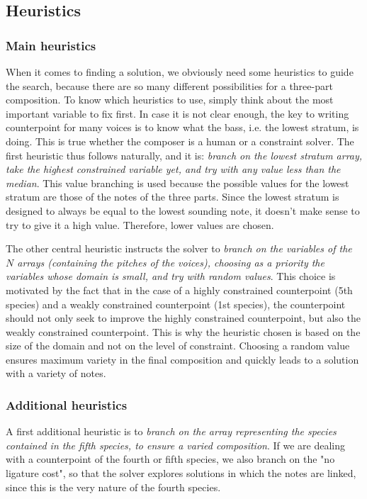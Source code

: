 \subsection{Heuristics} \label{heuristics}
\subsubsection{Main heuristics}
When it comes to finding a solution, we obviously need some heuristics to guide the search, because there are so many different possibilities for a three-part composition. 
To know which heuristics to use, simply think about the most important variable to fix first. In case it is not clear enough, the key to writing counterpoint for many voices is to know what the bass, i.e. the lowest stratum, is doing. This is true whether the composer is a human or a constraint solver. The first heuristic thus follows naturally, and it is: \textit{branch on the lowest stratum array, take the highest constrained variable yet, and try with any value less than the median}. This value branching is used because the possible values for the lowest stratum are those of the notes of the three parts. Since the lowest stratum is designed to always be equal to the lowest sounding note, it doesn't make sense to try to give it a high value. Therefore, lower values are chosen.


The other central heuristic instructs the solver to \textit{branch on the variables of the $N$ arrays (containing the pitches of the voices), choosing as a priority the variables whose domain is small, and try with random values}. This choice is motivated by the fact that in the case of a highly constrained counterpoint (5th species) and a weakly constrained counterpoint (1st species), the counterpoint should not only seek to improve the highly constrained counterpoint, but also the weakly constrained counterpoint. This is why the heuristic chosen is based on the size of the domain and not on the level of constraint. Choosing a random value ensures maximum variety in the final composition and quickly leads to a solution with a variety of notes.


\subsubsection{Additional heuristics}
A first additional heuristic is to \textit{branch on the array representing the species contained in the fifth species, to ensure a varied composition}. If we are dealing with a counterpoint of the fourth or fifth species, we also branch on the "no ligature cost", so that the solver explores solutions in which the notes are linked, since this is the very nature of the fourth species.

